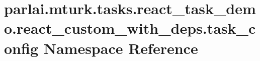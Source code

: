 \hypertarget{namespaceparlai_1_1mturk_1_1tasks_1_1react__task__demo_1_1react__custom__with__deps_1_1task__config}{}\section{parlai.\+mturk.\+tasks.\+react\+\_\+task\+\_\+demo.\+react\+\_\+custom\+\_\+with\+\_\+deps.\+task\+\_\+config Namespace Reference}
\label{namespaceparlai_1_1mturk_1_1tasks_1_1react__task__demo_1_1react__custom__with__deps_1_1task__config}
